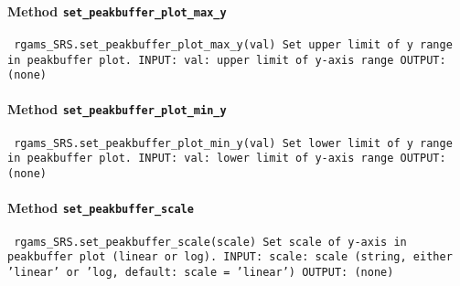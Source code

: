 \paragraph{Method \texttt{set_peakbuffer_plot_max_y}}
\vspace{1ex}
\texttt{\newline
rgams_SRS.set_peakbuffer_plot_max_y(val)\newline
\newline
Set upper limit of y range in peakbuffer plot.\newline
\newline
INPUT:\newline
val: upper limit of y-axis range\newline
\newline
OUTPUT:\newline
(none)\newline
\newline
}

\paragraph{Method \texttt{set_peakbuffer_plot_min_y}}
\vspace{1ex}
\texttt{\newline
rgams_SRS.set_peakbuffer_plot_min_y(val)\newline
\newline
Set lower limit of y range in peakbuffer plot.\newline
\newline
INPUT:\newline
val: lower limit of y-axis range\newline
\newline
OUTPUT:\newline
(none)\newline
\newline
}

\paragraph{Method \texttt{set_peakbuffer_scale}}
\vspace{1ex}
\texttt{\newline
rgams_SRS.set_peakbuffer_scale(scale)\newline
\newline
Set scale of y-axis in peakbuffer plot (linear or log).\newline
\newline
INPUT:\newline
scale: scale (string, either 'linear' or 'log, default: scale = 'linear')\newline
\newline
OUTPUT:\newline
(none)\newline
\newline
}

